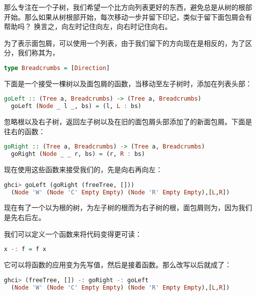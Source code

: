 \documentclass[./main.tex]{subfiles}
\begin{document}
那么专注在一个子树，我们希望一个比方向列表更好的东西，避免总是从树的根部开始。那么如果从树根部开始，每次移动一步并留下印记，类似于留下面包屑会有帮助吗？
换言之，向左时记住向左，向右时记住向右。

为了表示面包屑，可以使用一个列表，由于我们留下的方向现在是相反的，为了区分，我们称其为，

\begin{lstlisting}[language=Haskell]
  type Breadcrumbs = [Direction]
\end{lstlisting}

下面是一个接受一棵树以及面包屑的函数，当移动至左子树时，添加在列表头部：

\begin{lstlisting}[language=Haskell]
  goLeft :: (Tree a, Breadcrumbs) -> (Tree a, Breadcrumbs)
  goLeft (Node _ l _, bs) = (l, L : bs)
\end{lstlisting}

忽略根以及右子树，返回左子树以及在旧的面包屑头部添加了的新面包屑。下面是往右的函数：

\begin{lstlisting}[language=Haskell]
  goRight :: (Tree a, Breadcrumbs) -> (Tree a, Breadcrumbs)
  goRight (Node _ _ r, bs) = (r, R : bs)
\end{lstlisting}

现在使用这些函数来接受我们的，先是向右再向左：

\begin{lstlisting}[language=Haskell]
  ghci> goLeft (goRight (freeTree, []))
  (Node 'W' (Node 'C' Empty Empty) (Node 'R' Empty Empty),[L,R])
\end{lstlisting}

现在有了一个以为根的树，为左子树的根而为右子树的根，面包屑则为\acode{[L, R]}，因为我们是先右后左。

我们可以定义一个\acode{-:}函数来将代码变得更可读：

\begin{lstlisting}[language=Haskell]
  x -: f = f x
\end{lstlisting}

它可以将函数的应用变为先写值，然后是\acode{-:}接着函数。那么改写以后就成了：

\begin{lstlisting}[language=Haskell]
  ghci> (freeTree, []) -: goRight -: goLeft
  (Node 'W' (Node 'C' Empty Empty) (Node 'R' Empty Empty),[L,R])
\end{lstlisting}
\end{document}
